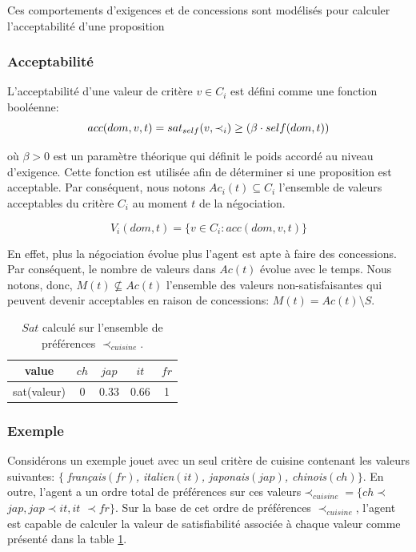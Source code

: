 		
	Ces comportements d'exigences et de concessions sont modélisés pour calculer l'acceptabilité d'une proposition 
	
	\subsubsection{Acceptabilité }
	L'acceptabilité d'une valeur de critère $v \in C_i$ est défini comme une fonction booléenne:
	\begin{equation}
	\vspace{0.5em}
	acc(dom,v, t) = sat_{self}(v, \prec_i) \geq  (\beta \cdot self(dom,t))
	\end{equation}
	
	\medskip
	où $\beta>0$ est un paramètre théorique qui définit le poids accordé au niveau d'exigence. Cette fonction est utilisée afin de déterminer si une proposition est acceptable. Par conséquent, nous notons $Ac_i(t) \subseteq C_i $ l'ensemble de valeurs acceptables du critère $C_i$ au moment $t$ de la négociation. 
	
	\begin{equation}
	V_i(dom,t) = \{ v\in C_i : acc(dom,v,t) \}
	\end{equation}
	
	En effet, plus la négociation évolue plus l'agent est apte à faire des concessions. Par conséquent, le nombre de valeurs dans $Ac(t)$ évolue avec le temps. 	Nous notons, donc, $M(t) \not \subseteq Ac(t)$ l'ensemble des valeurs non-satisfaisantes qui peuvent devenir acceptables en raison de concessions: $M(t)=Ac(t)\setminus S$.
	
		\begin{table} [h]
		\centering
		\begin{tabular}{ |c|c|c|c|c| }
			\hline
			value & $ch$ & $jap$ & $it$ & $fr$ \\	
			\hline
			sat(valeur) & 0 & 0.33 & 0.66 & 1 \\
			\hline
		\end{tabular}
		\caption{$Sat$ calculé sur l'ensemble de préférences $\prec_{cuisine}$.}
		\label{tab:ch4sat}	
	\end{table}
	\subsubsection{Exemple}

	Considérons un exemple jouet avec un seul critère de cuisine contenant les valeurs suivantes: 
	$\{$ \emph {français$ (fr)$, italien$ (it)$, japonais$ (jap)$, chinois$ (ch)$}$ \}$. En outre, l'agent a un ordre total de préférences sur ces valeurs$ \prec_ {cuisine}$$ = \{ch$$ \prec$$ jap, jap$$ \prec$$ it,  it$ $\prec$$ fr\}$. Sur la base de cet ordre de préférences $\prec_{cuisine}$, l'agent est capable de calculer la valeur de satisfiabilité associée à chaque valeur comme présenté dans la table \ref {tab:ch4sat}.
	
